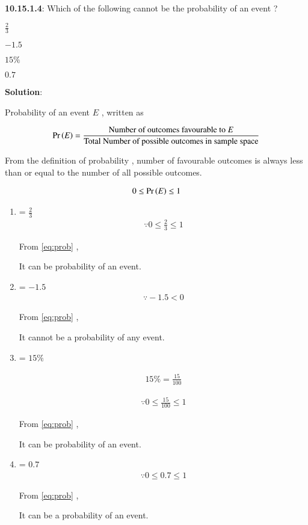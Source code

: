 \documentclass[journal,12pt,twocolumn]{IEEEtran}
\begin{document}
\noindent  \textbf{10.15.1.4}:
 Which of the following cannot be the probability of an event ? 

\begin{enumerate*}[label=(\Alph*)]
\item \(\frac23\) 
\item \(-1.5\) 
\item \(15\%\) 
\item \(0.7\) 
\end{enumerate*}


\noindent \textbf{Solution}:

Probability of an event $E$ , written as \:

\begin{align}
\label{eq:def}
\Pr\left(E\right)=\frac{\text{Number of outcomes favourable to $E$}}{\text{Total Number of possible outcomes in sample space}}
\end{align}


From the definition of probability , number of favourable outcomes is always less than or equal to the number of all possible outcomes.


\begin{align}
   \label{eq:prob}
   0 \le \Pr\left(E\right)\le 1 
\end{align}
\begin{enumerate}[label=(\Alph*)]
    

\item {} = \(\frac23\)
\begin{align}
    \because 0 \le \frac23 \le 1
\end{align}

From \eqref{eq:prob} ,

 It can be probability of an event.

\item {} = \(-1.5\)
\begin{align}
\because  -1.5 < 0 
\end{align}

From \eqref{eq:prob} ,

It cannot be a probability of any event.

\item {} = \(15\%\)

\begin{align}
15\%=\frac{15}{100}
\end{align}

\begin{align}
\because 0 \le \frac{15}{100} \le 1
\end{align}

From \eqref{eq:prob} ,

\indent It can be probability of an event.

\item {} = \(0.7\) 
\begin{align}
\because 0 \le 0.7 \le 1 
\end{align}

From \eqref{eq:prob} ,

It can be a probability of an event.
\end{enumerate}
\end{document}
